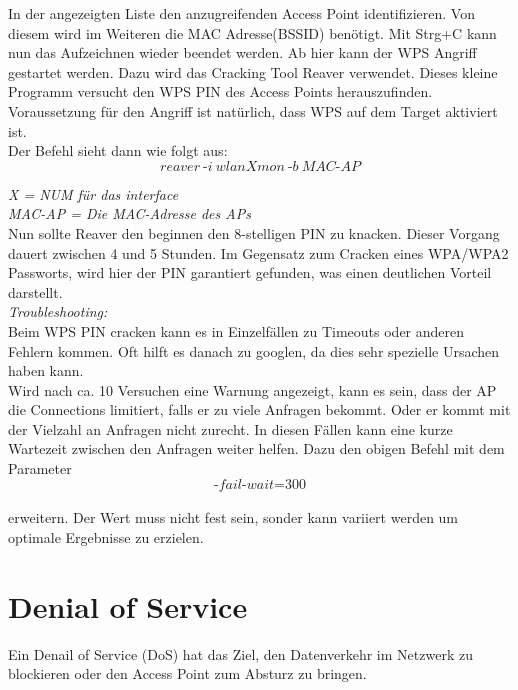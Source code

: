 In der angezeigten Liste den anzugreifenden Access Point identifizieren. Von diesem wird im Weiteren die MAC Adresse(BSSID) benötigt.
Mit Strg+C kann nun das Aufzeichnen wieder beendet werden. Ab hier kann der WPS Angriff gestartet werden. Dazu wird das Cracking Tool Reaver verwendet. Dieses kleine Programm versucht den WPS PIN des Access Points herauszufinden. Voraussetzung für den Angriff ist natürlich, dass WPS auf dem Target aktiviert ist. \\

Der Befehl sieht dann wie folgt aus:\\


$$reaver~\text{-}i~wlanXmon~\text{-}b~MAC\text{-}AP$$

\textit{X = NUM für das interface}\\ 
\textit{MAC-AP = Die MAC-Adresse des APs}\\ 

Nun sollte Reaver den beginnen den 8-stelligen PIN zu knacken. Dieser Vorgang dauert zwischen 4 und 5 Stunden. Im Gegensatz zum Cracken eines WPA/WPA2 Passworts, wird hier der PIN garantiert gefunden, was einen deutlichen Vorteil darstellt. \\

\textit{Troubleshooting:}\\

Beim WPS PIN cracken kann es in Einzelfällen zu Timeouts oder anderen Fehlern kommen. Oft hilft es danach zu googlen, da dies sehr spezielle Ursachen haben kann. \\

Wird nach ca. 10 Versuchen eine Warnung angezeigt, kann es sein, dass der AP die Connections limitiert, falls er zu viele Anfragen bekommt. Oder er kommt mit der Vielzahl an Anfragen nicht zurecht. In diesen Fällen kann eine kurze Wartezeit zwischen den Anfragen weiter helfen. Dazu den obigen Befehl mit dem Parameter\\

$$\text{-}fail\text{-}wait\text{=}300$$\\

erweitern. Der Wert muss nicht fest sein, sonder kann variiert werden um optimale Ergebnisse zu erzielen. 

\section{Denial of Service}
Ein Denail of Service (DoS) hat das Ziel, den Datenverkehr im Netzwerk zu blockieren oder den Access Point zum Absturz zu bringen.\\
 
